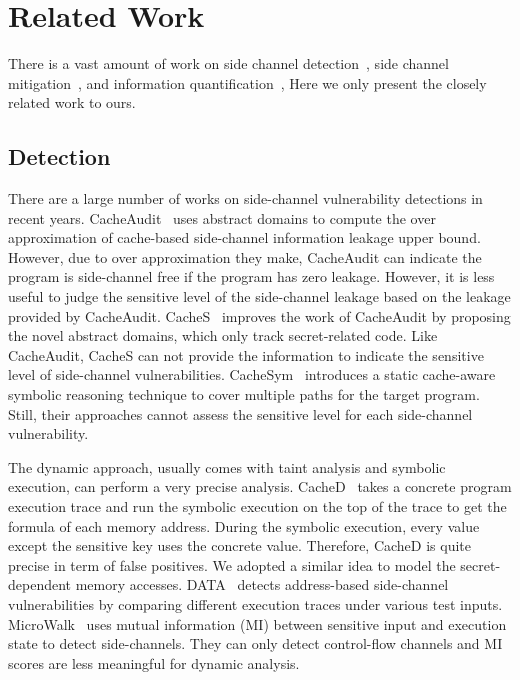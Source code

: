 \section{Related Work}

There is a vast amount of work on 
side channel 
detection~\cite{182946, 236338, Brotzman19Casym, 203878,217537,Wichelmann:2018:MFF:3274694.3274741,langley2010ctgrind}, 
side channel mitigation~\cite{Page2005PartitionedCA,
Wang:2007:NCD:1250662.1250723,Zhang:2015:HDL:2775054.2694372,Li:2014:SLH:2541940.2541947,
236344,shih2017t,Coppens:2009:PMT:1607723.1608124,
brickell2006software,crane2015thwarting}, 
and information
quantification~\cite{10.1007/978-3-642-31424-7_40,McCamantE2008,5207642,Phan:2012:SQI:2382756.2382791,Chattopadhyay:2017:QIL:3127041.3127044}, 
Here we only present the closely related work to ours.

\subsection{Detection}

There are a large number of works on side-channel vulnerability detections in
recent years.  CacheAudit~\cite{182946} uses abstract domains to compute the
over approximation of cache-based side-channel information leakage upper bound.
However, due to over approximation they make, CacheAudit can indicate the
program is side-channel free if the program has zero leakage.  However, it is
less useful to judge the sensitive level of the side-channel leakage based on
the leakage provided by CacheAudit. CacheS~\cite{236338} improves the work of
CacheAudit by proposing the novel abstract domains, which only track
secret-related code. Like CacheAudit, CacheS can not provide the information to
indicate the sensitive level of side-channel vulnerabilities.
CacheSym~\cite{Brotzman19Casym} introduces a static cache-aware symbolic
reasoning technique to cover multiple paths for the target program. Still, their
approaches cannot assess the sensitive level for each side-channel
vulnerability.

The dynamic approach, usually comes with taint analysis and symbolic execution,
can perform a very precise analysis. CacheD~\cite{203878} takes a concrete
program execution trace and run the symbolic execution on the top of the trace
to get the formula of each memory address. During the symbolic execution, every
value except the sensitive key uses the concrete value. Therefore, CacheD is
quite precise in term of false positives. We adopted a similar idea to model the
secret-dependent memory accesses. DATA~\cite{217537} detects address-based
side-channel vulnerabilities by comparing different execution traces under
various test inputs. MicroWalk~\cite{Wichelmann:2018:MFF:3274694.3274741} uses
mutual information (MI) between sensitive input and execution state to detect
side-channels. They can only detect control-flow channels and MI scores are less
meaningful for dynamic analysis.

